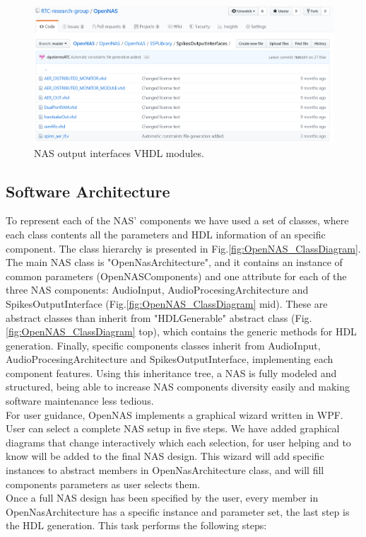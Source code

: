 \begin{figure}[H]
\centering
\includegraphics[width=1\textwidth]{images/Img09_SpikesOutputInterfaces.PNG}
\caption{\label{fig:OpenNAS_SpikeOutputInterface}NAS output interfaces VHDL modules.}
\end{figure}


\subsection{Software Architecture}

To represent each of the NAS' components we have used a set of classes, where each class contents all the parameters and HDL information of an specific component. The class hierarchy is presented in Fig.\ref{fig:OpenNAS_ClassDiagram}. The main NAS class is "OpenNasArchitecture", and it contains an instance of common parameters (OpenNASComponents) and one attribute for each of the three NAS components: AudioInput, AudioProcesingArchitecture and SpikesOutputInterface (Fig.\ref{fig:OpenNAS_ClassDiagram} mid). These are abstract classes than inherit from "HDLGenerable" abstract class (Fig.\ref{fig:OpenNAS_ClassDiagram} top), which contains the generic methods for HDL generation. Finally, specific components classes inherit from AudioInput, AudioProcesingArchitecture and SpikesOutputInterface, implementing each component features. Using this inheritance tree, a NAS is fully modeled and structured, being able to increase NAS components diversity easily and making software maintenance less tedious.\\

For user guidance, OpenNAS implements a graphical wizard written in WPF. User can select a complete NAS setup in five steps. We have added graphical diagrams that change interactively which each selection, for user helping and to know  will be added to the final NAS design. This wizard will add specific instances to abstract members in OpenNasArchitecture class, and will fill components parameters as user selects them.
\\
Once a full NAS design has been specified by the user, every member in OpenNasArchitecture has a specific instance and parameter set, the last step is the HDL generation. This task performs the following steps:

